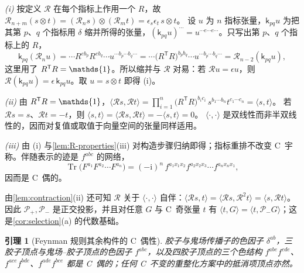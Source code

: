 \documentclass[UTF8,a4paper,11pt,fontset=fandol]{ctexart}
\makeatletter
\let\amsmathbb\mathbb
\renewcommand{\mathbb}[1]{\ifx1#1\mathds{1}\else\amsmathbb{#1}\fi}
\theoremstyle{cplain}
\newtheorem{lemma}[theorem]{引理}
\theoremstyle{cdefinition}
\theoremstyle{cremark}
\renewcommand{\proofname}{证明}
\renewenvironment{proof}[1][\proofname]{\par\pushQED{\qed}\normalfont\topsep6\p@\@plus6\p@\relax
  \trivlist\item[\hskip\labelsep\itshape #1\hspace{0.5em}]\ignorespaces}{\popQED\endtrivlist\@endpefalse}
\numberwithin{equation}{section}
\DeclareMathOperator{\Tr}{Tr}
\newcommand{\tp}{\mathsf{T}}                         %
\newcommand{\Rop}{\mathcal{R}}                       %
\newcommand{\Pp}{\mathcal{P}_{+}}                    %
\newcommand{\Pm}{\mathcal{P}_{-}}                    %
\newcommand{\ii}{\mathrm{i}}                        %
\makeatother
\begin{document}
\begin{proof}
\emph{(i)} 按定义 $\Rop$ 在每个指标上作用一个 $R$，故 $\Rop_{n+m}(s\otimes t)=(\Rop_ns)\otimes(\Rop_mt)=\epsilon_s\epsilon_t\,s\otimes t$。
设 $u$ 为 $n$ 指标张量，$\mathsf k_{pq}u$ 为把其第 $p$、$q$ 个指标用 $\delta$ 缩并所得的张量，$(\mathsf k_{pq}u)^{\cdots}=u^{\cdots e\cdots e\cdots}$。只写出第 $p$、$q$ 个指标上的 $R$，
\[
\mathsf k_{pq}(\Rop_nu)=\cdots R^{eb_p}R^{eb_q}\cdots u^{\cdots b_p\cdots b_q\cdots}=\cdots\bigl(R^{\tp}R\bigr)^{b_pb_q}\cdots u^{\cdots b_p\cdots b_q\cdots}=\Rop_{n-2}(\mathsf k_{pq}u),
\]
这里用了 $R^{\tp}R=\mathbb 1$。所以缩并与 $\Rop$ 对易：若 $\Rop u=\epsilon u$，则 $\Rop(\mathsf k_{pq}u)=\epsilon\,\mathsf k_{pq}u$。取 $u=s\otimes t$ 即得 (i)。

\emph{(ii)} 由 $R^{\tp}R=\mathbb 1$，$\langle\Rop s,\Rop t\rangle=\prod_{i=1}^n\bigl(R^{\tp}R\bigr)^{b_ic_i}\,s^{b_1\cdots b_n}t^{c_1\cdots c_n}=\langle s,t\rangle$。
若 $\Rop s=s$、$\Rop t=-t$，则 $\langle s,t\rangle=\langle\Rop s,\Rop t\rangle=-\langle s,t\rangle=0$。
$\langle\cdot,\cdot\rangle$ 是双线性而非半双线性的，因而对复值或取值于向量空间的张量同样适用。

\emph{(iii)} 由 (i) 与\cref{lem:R-properties}(iii) 对构造步骤归纳即得；指标重排不改变 C~宇称。伴随表示的迹是 $f^{abc}$ 的网络，
\begin{equation}\label{eq:color-adjoint-trace}
\Tr\bigl(F^{a_1}F^{a_2}\cdots F^{a_n}\bigr)=(-\ii)^n\,f^{a_1x_1x_2}f^{a_2x_2x_3}\cdots f^{a_nx_nx_1},
\end{equation}
因而是 C~偶的。
\end{proof}

由\cref{lem:contraction}(ii) 还可知 $\Rop$ 关于 $\langle\cdot,\cdot\rangle$ 自伴：$\langle\Rop s,t\rangle=\langle\Rop s,\Rop^2t\rangle=\langle s,\Rop t\rangle$。
因此 $\Pp,\Pm$ 是正交投影，并且对任意 $G$ 与 C~奇张量 $t$ 有 $\langle t,G\rangle=\langle t,\Pm G\rangle$；这是\cref{cor:selection}(a) 的代数基础。

\begin{lemma}[Feynman 规则其余构件的 C~偶性]\label{lem:building-blocks}
胶子与鬼场传播子的色因子 $\delta^{ab}$，三胶子顶点与鬼场--胶子顶点的色因子 $f^{abc}$，以及四胶子顶点的三个色结构
$f^{abe}f^{cde}$、$f^{ace}f^{bde}$、$f^{ade}f^{bce}$ 都是 C~偶的；任何 C~不变的重整化方案中的抵消项顶点亦然。
\end{lemma}
\end{document}
